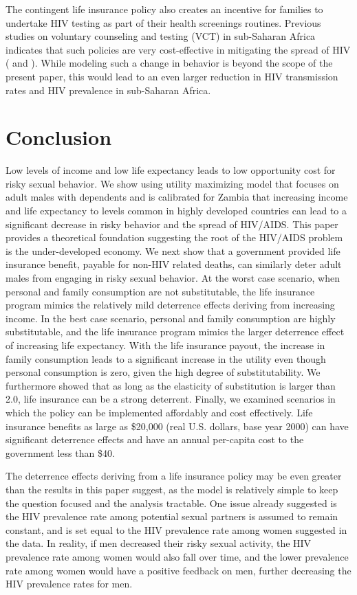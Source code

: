 \documentclass[12pt]{article}
\newcommand{\citee}[1]{\citet*{#1}}
\begin{document}
The contingent life insurance policy also creates an incentive for families to undertake HIV testing as part of their health screenings routines.  Previous studies on voluntary counseling and testing (VCT) in sub-Saharan Africa indicates that such policies are very cost-effective in mitigating the spread of HIV (\citee{B2010} and \citee{Setal2000}).  While modeling such a change in behavior is beyond the scope of the present paper, this would lead to an even larger reduction in HIV transmission rates and HIV prevalence in sub-Saharan Africa.

\section{Conclusion}
Low levels of income and low life expectancy leads to low opportunity cost for risky sexual behavior.  We show using utility maximizing model that focuses on adult males with dependents and is calibrated for Zambia that increasing income and life expectancy to levels common in highly developed countries can lead to a significant decrease in risky behavior and the spread of HIV/AIDS.  This paper provides a theoretical foundation suggesting the root of the HIV/AIDS problem is the under-developed economy.  We next show that a government provided life insurance benefit, payable for non-HIV related deaths, can similarly deter adult males from engaging in risky sexual behavior.  At the worst case scenario, when personal and family consumption are not substitutable, the life insurance program mimics the relatively mild deterrence effects deriving from increasing income.  In the best case scenario, personal and family consumption are highly substitutable, and the life insurance program mimics the larger deterrence effect of increasing life expectancy.  With the life insurance payout, the increase in family consumption leads to a significant increase in the utility even though personal consumption is zero, given the high degree of substitutability.  We furthermore showed that as long as the elasticity of substitution is larger than 2.0, life insurance can be a strong deterrent.  Finally, we examined scenarios in which the policy can be implemented affordably and cost effectively.  Life insurance benefits as large as \$20,000 (real U.S. dollars, base year 2000) can have significant deterrence effects and have an annual per-capita cost to the government less than \$40.

The deterrence effects deriving from a life insurance policy may be even greater than the results in this paper suggest, as the model is relatively simple to keep the question focused and the analysis tractable.  One issue already suggested is the HIV prevalence rate among potential sexual partners is assumed to remain constant, and is set equal to the HIV prevalence rate among women suggested in the data.  In reality, if men decreased their risky sexual activity, the HIV prevalence rate among women would also fall over time, and the lower prevalence rate among women would have a positive feedback on men, further decreasing the HIV prevalence rates for men.
\end{document}
